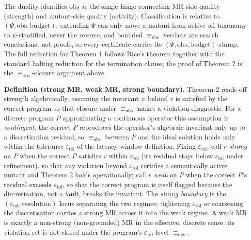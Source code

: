 \documentclass[manuscript,screen,review]{acmart}
\begin{document}
The duality identifies $\mathrm{obs}$ as the single hinge connecting MR-side
quality (strength) and mutant-side quality (activity). Classification
is relative to $(\Psi, \mathrm{obs}, \text{budget})$: extending $\Psi$ can only move
a mutant from active-off-taxonomy to $\psi$-stratified, never the
reverse, and bounded $\equiv_{\mathrm{obs}}$ verdicts are search conclusions,
not proofs, so every certificate carries its $(\Psi, \mathrm{obs}, \text{budget})$
stamp. The full reduction for Theorem 1 follows Rice's theorem together
with the standard halting reduction for the termination clause; the
proof of Theorem 2 is the $\equiv_{\mathrm{obs}}$-closure argument above.

\textbf{Definition (strong MR, weak MR, strong boundary).} Theorem 2
reads off strength algebraically, assuming the invariant $\psi$ behind
$r$ is satisfied by the correct program so that closure under
$\equiv_{\mathrm{obs}}$ makes a violation diagnostic. For a discrete program $P$
approximating a continuous operator this assumption is \emph{contingent}:
the correct $P$ reproduces the operator's algebraic invariant only up to
a discretisation residual, so $\equiv_{\mathrm{obs}}$ between $P$ and the ideal
solution holds only within the tolerance $\varepsilon_{\mathrm{tol}}$ of
the latency-window definition. Fixing $\varepsilon_{\mathrm{tol}}$, call
$r$ \emph{strong} on $P$ when the correct $P$ satisfies $r$ within
$\varepsilon_{\mathrm{tol}}$ (its residual stays below
$\varepsilon_{\mathrm{tol}}$ under refinement), so that any violation
beyond $\varepsilon_{\mathrm{tol}}$ certifies a semantically active
mutant and Theorem 2 holds operationally; call $r$ \emph{weak} on $P$
when the correct $P$'s residual exceeds $\varepsilon_{\mathrm{tol}}$, so
that the correct program is itself flagged because the discretisation,
not a fault, breaks the invariant. The \emph{strong boundary} is the
$(\varepsilon_{\mathrm{tol}}, \text{resolution})$ locus separating the
two regimes; tightening $\varepsilon_{\mathrm{tol}}$ or coarsening the
discretisation carries a strong MR across it into the weak regime. A weak
MR is exactly a non-strong (non-grounded) MR in the effective, discrete
sense: its violation set is not closed under the program's
$\varepsilon_{\mathrm{tol}}$-level $\equiv_{\mathrm{obs}}$.
\end{document}
